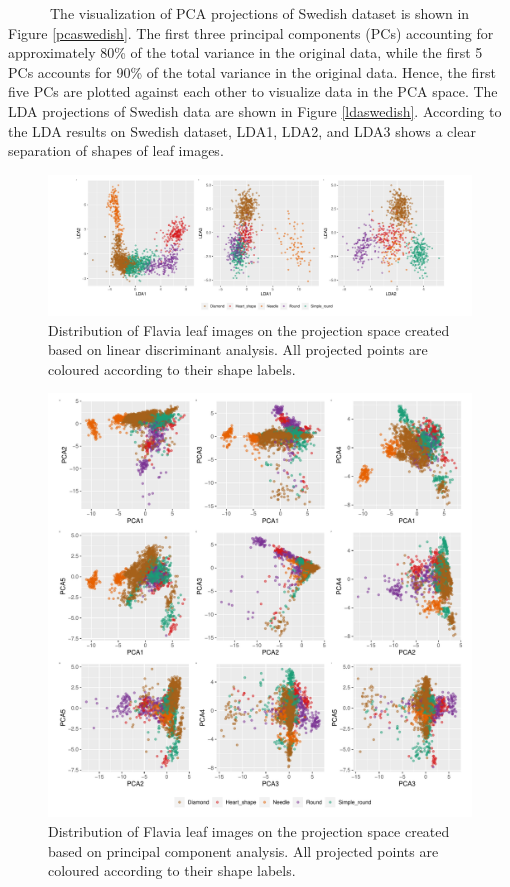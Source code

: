 \documentclass{article}
\begin{document}
~~~~~~The visualization of PCA projections of Swedish dataset is shown
in Figure \ref{pcaswedish}. The first three principal components (PCs)
accounting for approximately 80\% of the total variance in the original
data, while the first 5 PCs accounts for 90\% of the total variance in
the original data. Hence, the first five PCs are plotted against each
other to visualize data in the PCA space. The LDA projections of Swedish
data are shown in Figure \ref{ldaswedish}. According to the LDA results
on Swedish dataset, LDA1, LDA2, and LDA3 shows a clear separation of
shapes of leaf images.

\begin{figure}
\centering
\includegraphics{img/ldaflavia-1.pdf}
\caption{\label{ldaflavia}Distribution of Flavia leaf images on the
projection space created based on linear discriminant analysis. All
projected points are coloured according to their shape labels.}
\end{figure}

\begin{figure}
\centering
\includegraphics{img/pcaflavia-1.pdf}
\caption{\label{pcaflavia}Distribution of Flavia leaf images on the
projection space created based on principal component analysis. All
projected points are coloured according to their shape labels.}
\end{figure}
\end{document}
